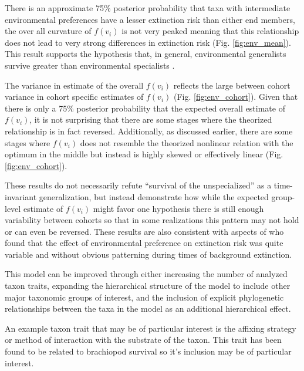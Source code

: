 \documentclass[12pt,letterpaper]{article}
\begin{document}
There is an approximate 75\% posterior probability that taxa with intermediate environmental preferences have a lesser extinction risk than either end members, the over all curvature of \(f(v_{i})\) is not very peaked meaning that this relationship does not lead to very strong differences in extinction risk (Fig. \ref{fig:env_mean}). This result supports the hypothesis that, in general, environmental generalists survive greater than environmental specialists \citep{Simpson1944,Liow2004a,Liow2007b,Nurnberg2013a,Nurnberg2015}.

The variance in estimate of the overall \(f(v_{i})\) reflects the large between cohort variance in cohort specific estimates of \(f(v_{i})\) (Fig. \ref{fig:env_cohort}). Given that there is only a 75\% posterior probability that the expected overall estimate of \(f(v_{i})\), it is not surprising that there are some stages where the theorized relationship is in fact reversed. Additionally, as discussed earlier, there are some stages where \(f(v_{i})\) does not resemble the theorized nonlinear relation with the optimum in the middle but instead is highly skewed or effectively linear (Fig. \ref{fig:env_cohort}). 

These results do not necessarily refute ``survival of the unspecialized'' as a time-invariant generalization, but instead demonstrate how while the expected group-level estimate of \(f(v_{i})\) might favor one hypothesis there is still enough variability between cohorts so that in some realizations this pattern may not hold or can even be reversed. These results are also consistent with aspects of \citet{Miller2009a} who found that the effect of environmental preference on extinction risk was quite variable and without obvious patterning during times of background extinction.


This model can be improved through either increasing the number of analyzed taxon traits, expanding the hierarchical structure of the model to include other major taxonomic groups of interest, and the inclusion of explicit phylogenetic relationships between the taxa in the model as an additional hierarchical effect.

An example taxon trait that may be of particular interest is the affixing strategy or method of interaction with the substrate of the taxon. This trait has been found to be related to brachiopod survival \citep{Alexander1977} so it's inclusion may be of particular interest.
\end{document}
